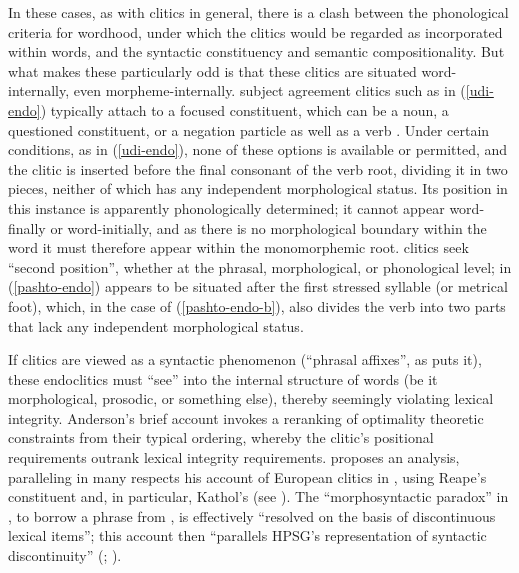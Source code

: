 \documentclass[output=paper
	        ,collection
	        ,collectionchapter
 	        ,biblatex
                ,babelshorthands
                ,newtxmath
                ,draftmode
                ,colorlinks, citecolor=brown
]{langscibook}
\begin{document}
In these cases, as with clitics in general, there is a clash between the phonological criteria for wordhood, under which the clitics would be regarded as incorporated within words, and the syntactic constituency and semantic compositionality.
But what makes these particularly odd is that these clitics are situated word-internally, even morpheme-internally. 
 subject agreement clitics such as  in (\ref{udi-endo}) typically attach to a focused constituent, which can be a noun, a questioned constituent, or a negation particle as well as a verb \citep{Harris2000}.
Under certain conditions, as in (\ref{udi-endo}), none of these options is available or permitted, and the clitic is inserted before the final consonant of the verb root, dividing it in two pieces, neither of which has any independent morphological status.
Its position in this instance is apparently phonologically determined; it cannot appear word-finally or word-initially, and as there is no morphological boundary within the word it must therefore appear within the monomorphemic root.
 clitics  seek ``second position'', whether at the phrasal, morphological, or phonological level;  in (\ref{pashto-endo}) appears to be situated after the first stressed syllable (or metrical foot), which, in the case of (\ref{pashto-endo-b}), also divides the verb into two parts that lack any independent morphological status.

If clitics are viewed as a syntactic phenomenon (``phrasal affixes'', as \citealt{Anderson2005} puts
it), these endoclitics must ``see'' into the internal structure of words (be it morphological,
prosodic, or something else), thereby seemingly violating  lexical
integrity. Anderson's brief account invokes a reranking of optimality theoretic constraints from
their typical ordering, whereby the clitic's positional requirements outrank lexical integrity
requirements. \citet{Crysmann2000b} proposes an analysis, paralleling in many respects his account
of European  clitics in \citet{Crysmann2000a}, using Reape's constituent  \citep{Reape1994} and, in particular, Kathol's 
\citep{Kathol2000a}\addpages (see ). The ``morphosyntactic paradox'' in , to borrow
a phrase from \citet[]{Crysmann2003d}, is effectively ``resolved on the basis of discontinuous lexical items''; this account then ``parallels HPSG's representation of syntactic discontinuity'' (\citealt{Crysmann2000b}; ).
\end{document}
